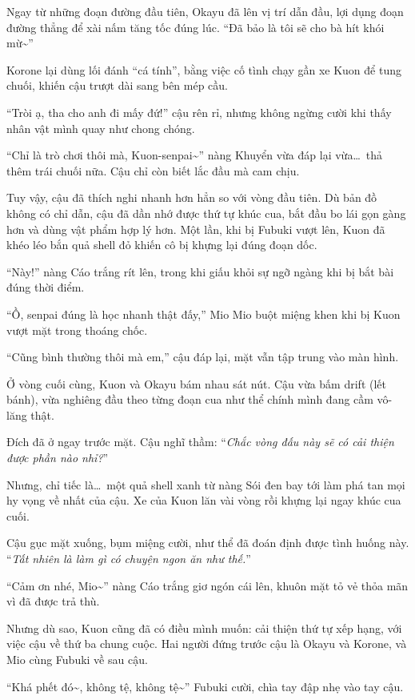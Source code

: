 \documentclass[../main.tex]{subfiles}
\begin{document}
Ngay từ những đoạn đường đầu tiên, Okayu đã lên vị trí dẫn đầu, lợi dụng đoạn đường thẳng để xài nấm tăng tốc đúng lúc. ``Đã bảo là tôi sẽ cho bà hít khói mừ\~{}''

Korone lại dùng lối đánh ``cá tính'', bằng việc cố tình chạy gần xe Kuon để tung chuối, khiến cậu trượt dài sang bên mép cầu.

``Tròi ạ, tha cho anh đi mấy đứ!'' cậu rên rỉ, nhưng không ngừng cười khi thấy nhân vật mình quay như chong chóng.

``Chỉ là trò chơi thôi mà, Kuon-senpai\~{}'' nàng Khuyển vừa đáp lại vừa\dots\ thả thêm trái chuối nữa. Cậu chỉ còn biết lắc đầu mà cam chịu.

Tuy vậy, cậu đã thích nghi nhanh hơn hẳn so với vòng đầu tiên. Dù bản đồ không có chỉ dẫn, cậu đã dần nhớ được thứ tự khúc cua, bắt đầu bo lái gọn gàng hơn và dùng vật phẩm hợp lý hơn. Một lần, khi bị Fubuki vượt lên, Kuon đã khéo léo bắn quả shell đỏ khiến cô bị khựng lại đúng đoạn dốc.

``Này!'' nàng Cáo trắng rít lên, trong khi giấu khỏi sự ngỡ ngàng khi bị bắt bài đúng thời điểm.

``Ồ, senpai đúng là học nhanh thật đấy,'' Mio  Mio buột miệng khen khi bị Kuon vượt mặt trong thoáng chốc.

``Cũng bình thường thôi mà em,'' cậu đáp lại, mặt vẫn tập trung vào màn hình.

Ở vòng cuối cùng, Kuon và Okayu bám nhau sát nút. Cậu vừa bấm drift (lết bánh), vừa nghiêng đầu theo từng đoạn cua như thể chính mình đang cầm vô-lăng thật.

Đích đã ở ngay trước mặt. Cậu nghĩ thầm: ``\textit{Chắc vòng đấu này sẽ có cải thiện được phần nào nhỉ?}''

Nhưng, chỉ tiếc là\dots\ một quả shell xanh từ nàng Sói đen bay tới làm phá tan mọi hy vọng về nhất của cậu. Xe của Kuon lăn vài vòng rồi khựng lại ngay khúc cua cuối.

Cậu gục mặt xuống, bụm miệng cười, như thể đã đoán định được tình huống này. ``\textit{Tất nhiên là làm gì có chuyện ngon ăn như thế.}''

``Cảm ơn nhé, Mio\~{}'' nàng Cáo trắng giơ ngón cái lên, khuôn mặt tỏ vẻ thỏa mãn vì đã được trả thù.

Nhưng dù sao, Kuon cũng đã có điều mình muốn: cải thiện thứ tự xếp hạng, với việc cậu về thứ ba chung cuộc. Hai người đứng trước cậu là Okayu và Korone, và Mio cùng Fubuki về sau cậu.

``Khá phết đó\~{}, không tệ, không tệ\~{}'' Fubuki cười, chìa tay đập nhẹ vào tay cậu.
\end{document}
